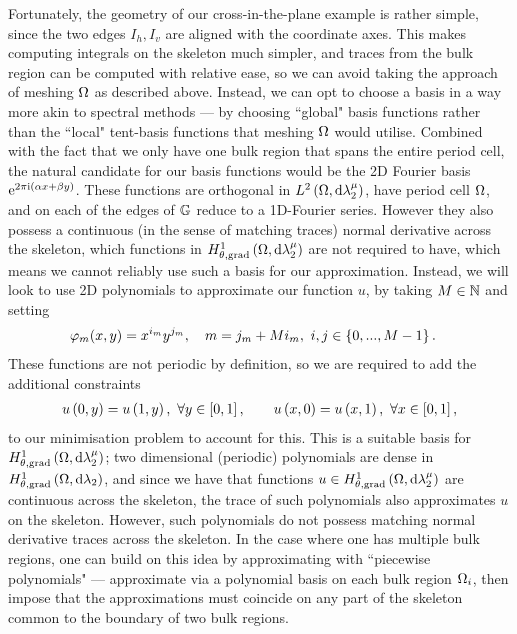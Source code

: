 Fortunately, the geometry of our cross-in-the-plane example is rather simple, since the two edges $I_h, I_v$ are aligned with the coordinate axes.
This makes computing integrals on the skeleton much simpler, and traces from the bulk region can be computed with relative ease, so we can avoid taking the approach of meshing $\Omega$ as described above.
Instead, we can opt to choose a basis in a way more akin to spectral methods --- by choosing ``global" basis functions rather than the ``local" tent-basis functions that meshing $\Omega$ would utilise.
Combined with the fact that we only have one bulk region that spans the entire period cell, the natural candidate for our basis functions would be the 2D Fourier basis $\mathrm{e}^{2\pi\mathrm{i}(\alpha x + \beta y)}$.
These functions are orthogonal in $L^{2}\left( \Omega,\mathrm{d} \lambda_2^{\mu} \right)$, have period cell $\Omega$, and on each of the edges of $\mathbb{G}$ reduce to a 1D-Fourier series.
However they also possess a continuous (in the sense of matching traces) normal derivative across the skeleton, which functions in $H^1_{\theta, \mathrm{grad}}\left( \Omega, \mathrm{d}\lambda_2^{\mu} \right)$ are not required to have, which means we cannot reliably use such a basis for our approximation.
Instead, we will look to use 2D polynomials to approximate our function $u$, by taking $M\in\mathbb{N}$ and setting
\begin{align} \label{eq:2DPolyBasisDef}
	\varphi_m(x,y) &= x^{i_m} y^{j_m}, \quad m = j_m + Mi_m, \ i,j\in\clbracs{0,...,M-1}.
\end{align}
These functions are not periodic by definition, so we are required to add the additional constraints
\begin{align*}
	u\left( 0,y \right) = u\left( 1,y \right), \ \forall y\in\left[ 0,1 \right], 
	\qquad 
	u\left( x,0 \right) = u\left( x,1 \right), \ \forall x\in\left[ 0,1 \right],
\end{align*}
to our minimisation problem to account for this.
This is a suitable basis for $H^1_{\theta, \mathrm{grad}}\left( \Omega, \mathrm{d}\lambda_2^{\mu} \right)$; two dimensional (periodic) polynomials are dense in $H^1_{\theta, \mathrm{grad}}\left( \Omega, \mathrm{d}\lambda_2 \right)$, and since we have that functions $u\in H^1_{\theta, \mathrm{grad}}\left( \Omega, \mathrm{d}\lambda_2^{\mu} \right)$ are continuous across the skeleton, the trace of such polynomials also approximates $u$ on the skeleton.
However, such polynomials do not possess matching normal derivative traces across the skeleton.
In the case where one has multiple bulk regions, one can build on this idea by approximating with ``piecewise polynomials" --- approximate via a polynomial basis on each bulk region $\Omega_i$, then impose that the approximations must coincide on any part of the skeleton common to the boundary of two bulk regions.


